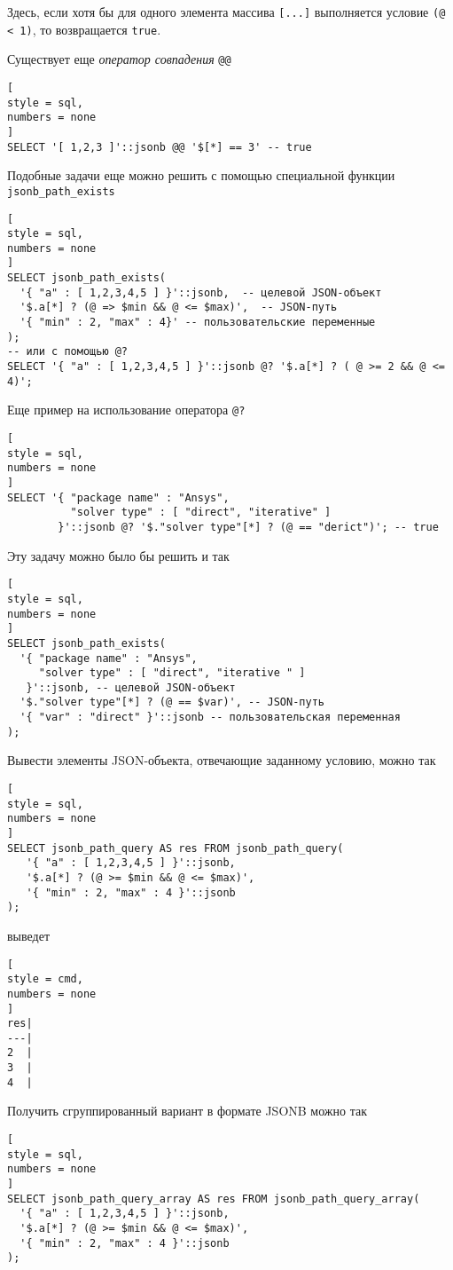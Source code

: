 \documentclass[%
	11pt,
	a4paper,
	utf8,
		]{article}
\begin{document}
Здесь, если хотя бы для одного элемента массива \verb|[...]| выполняется условие \verb|(@ < 1)|, то возвращается \texttt{true}.

Существует еще \emph{оператор совпадения} \verb|@@|
\begin{lstlisting}[
style = sql, 
numbers = none
]
SELECT '[ 1,2,3 ]'::jsonb @@ '$[*] == 3' -- true
\end{lstlisting}

Подобные задачи еще можно решить с помощью специальной функции \verb|jsonb_path_exists|
\begin{lstlisting}[
style = sql, 
numbers = none
]
SELECT jsonb_path_exists(
  '{ "a" : [ 1,2,3,4,5 ] }'::jsonb,  -- целевой JSON-объект
  '$.a[*] ? (@ => $min && @ <= $max)',  -- JSON-путь 
  '{ "min" : 2, "max" : 4}' -- пользовательские переменные
);
-- или с помощью @?
SELECT '{ "a" : [ 1,2,3,4,5 ] }'::jsonb @? '$.a[*] ? ( @ >= 2 && @ <= 4)';
\end{lstlisting}

Еще пример на использование оператора \verb|@?|
\begin{lstlisting}[
style = sql, 
numbers = none
]
SELECT '{ "package name" : "Ansys",
          "solver type" : [ "direct", "iterative" ]
        }'::jsonb @? '$."solver type"[*] ? (@ == "derict")'; -- true
\end{lstlisting}

Эту задачу можно было бы решить и так
\begin{lstlisting}[
style = sql, 
numbers = none
]
SELECT jsonb_path_exists(
  '{ "package name" : "Ansys",
     "solver type" : [ "direct", "iterative " ]
   }'::jsonb, -- целевой JSON-объект
  '$."solver type"[*] ? (@ == $var)', -- JSON-путь
  '{ "var" : "direct" }'::jsonb -- пользовательская переменная
);
\end{lstlisting}

Вывести элементы JSON-объекта, отвечающие заданному условию, можно так
\begin{lstlisting}[
style = sql, 
numbers = none
]
SELECT jsonb_path_query AS res FROM jsonb_path_query(
   '{ "a" : [ 1,2,3,4,5 ] }'::jsonb,
   '$.a[*] ? (@ >= $min && @ <= $max)',
   '{ "min" : 2, "max" : 4 }'::jsonb
);
\end{lstlisting}
выведет
\begin{lstlisting}[
style = cmd, 
numbers = none
]
res|
---|
2  |
3  |
4  |
\end{lstlisting}

Получить сгруппированный вариант в формате JSONB можно так
\begin{lstlisting}[
style = sql, 
numbers = none
]
SELECT jsonb_path_query_array AS res FROM jsonb_path_query_array(
  '{ "a" : [ 1,2,3,4,5 ] }'::jsonb,
  '$.a[*] ? (@ >= $min && @ <= $max)',
  '{ "min" : 2, "max" : 4 }'::jsonb
);
\end{lstlisting}
\end{document}
